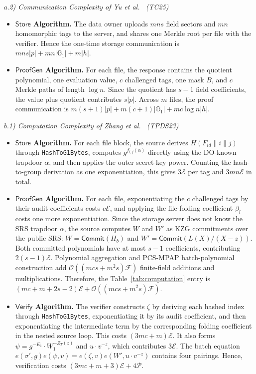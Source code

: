 \documentclass[lettersize,journal]{IEEEtran}
\newcommand{\GG}{\mathbb{G}}
\newcommand{\CompExp}{\mathcal{E}}
\newcommand{\CompPair}{\mathcal{P}}
\newcommand{\CompField}{\mathcal{F}}
\newcommand{\Store}{\mathsf{Store}}
\newcommand{\ProofGen}{\mathsf{ProofGen}}
\newcommand{\Verify}{\mathsf{Verify}}
\begin{document}
\noindent\textit{a.2) Communication Complexity of Yu et al.~\cite{YuTC25} (TC25)}
\begin{itemize}
\item \textbf{$\Store$ Algorithm.} The data owner uploads \(mns\) field sectors and \(mn\) homomorphic tags to the server, and shares one Merkle root per file with the verifier. Hence the one-time storage communication is \(mns|p|+mn|\GG_1|+m|h|\).
\item \textbf{$\ProofGen$ Algorithm.}  For each file, the response contains the quotient polynomial, one evaluation value, \(c\) challenged tags, one mask \(B\), and \(c\) Merkle paths of length $\log n$. Since the quotient has \(s-1\) field coefficients, the value plus quotient contributes \(s|p|\). Across \(m\) files, the proof communication is \(m(s+1)|p|+m(c+1)|\GG_1|+mc\log n|h|\).
\end{itemize}

\noindent\textit{b.1) Computation Complexity of Zhang et al.~\cite{ZhangTPDS23} (TPDS23)}
\begin{itemize}
\item \textbf{$\Store$ Algorithm.}  For each file block, the source derives \(H(F_{id}\|i\|j)\) through \texttt{HashToG1Bytes}, computes \(g^{f_{i,j}(\alpha)}\) directly using the DO-known trapdoor \(\alpha\), and then applies the outer secret-key power. Counting the hash-to-group derivation as one exponentiation, this gives \(3\CompExp\) per tag and \(3mn\CompExp\) in total.
\item \textbf{$\ProofGen$ Algorithm.} For each file, exponentiating the \(c\) challenged tags by their audit coefficients costs \(c\CompExp\), and applying the file-folding coefficient \(\beta_l\) costs one more exponentiation. Since the storage server does not know the SRS trapdoor \(\alpha\), the source computes \(W\) and \(W'\) as KZG commitments over the public SRS: \(W=\mathsf{Commit}(H_b)\) and \(W'=\mathsf{Commit}(L(X)/(X-z))\). Both committed polynomials have at most \(s-1\) coefficients, contributing \(2(s-1)\CompExp\). Polynomial aggregation and PCS-MPAP batch-polynomial construction add \(\mathcal{O}((mcs+m^2s)\CompField)\) finite-field additions and multiplications. Therefore, the Table~\ref{tab:computation} entry is \((mc+m+2s-2)\CompExp+\mathcal{O}((mcs+m^2s)\CompField)\).
\item \textbf{$\Verify$ Algorithm.} The verifier constructs \(\zeta\) by deriving each hashed index through \texttt{HashToG1Bytes}, exponentiating it by its audit coefficient, and then exponentiating the intermediate term by the corresponding folding coefficient in the nested source loop. This costs \((3mc+m)\CompExp\). It also forms \(\psi=g^{-E_1}\cdot W_1^{-Z_T(z)}\) and \(u\cdot v^{-z}\), which contributes \(3\CompExp\).  The batch equation \(e(\sigma',g)e(\psi,v)=e(\zeta,v)e(W',u\cdot v^{-z})\) contains four pairings. Hence, verification costs \((3mc+m+3)\CompExp+4\CompPair\).
\end{itemize}
\end{document}
